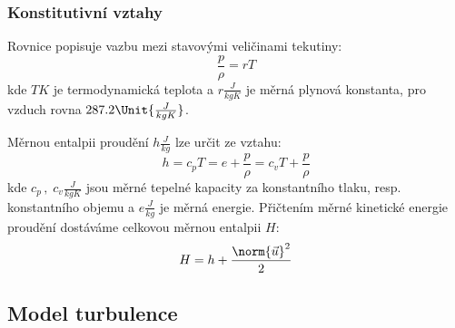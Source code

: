         \subsubsection{Konstitutivní vztahy}
        Rovnice popisuje vazbu mezi stavovými veličinami tekutiny:
        \begin{equation} \label{eq:stavova-rovnice}
            \frac{p}{\rho} = r T
        \end{equation}
        \noindent kde $T \unit{K}$ je termodynamická teplota a $r \unit{\frac{J}{kg K}}$ je měrná plynová konstanta, pro vzduch rovna $287.2 \Unit{\frac{J}{kg K}}$.
        
        Měrnou entalpii proudění $h \unit{\frac{J}{kg}}$ lze určit ze vztahu:
        \begin{equation} \label{eq:entalpie}
            h = c_p T = e + \frac{p}{\rho} = c_v T + \frac{p}{\rho}
        \end{equation}
        \noindent kde $c_p \, , \; c_v  \unit{\frac{J}{kg K}}$ jsou měrné tepelné kapacity za konstantního tlaku, resp. konstantního objemu a $e \unit{\frac{J}{kg}}$ je měrná energie. Přičtením měrné kinetické energie proudění dostáváme celkovou měrnou entalpii $H$:
        \begin{equation} \label{eq:celkova-entalpie}
            H = h + \frac{\norm{\Vec{u}}^2}{2}
        \end{equation}

    \newpage
        
    \subsection{Model turbulence}

